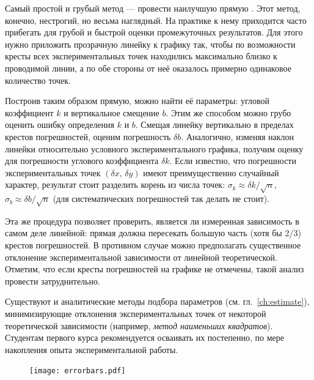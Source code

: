Самый простой и грубый метод --- провести наилучшую прямую
. Этот метод, конечно, нестрогий,
но весьма наглядный. На практике к нему приходится часто прибегать
для грубой и быстрой оценки промежуточных результатов. Для этого нужно
приложить прозрачную линейку к графику так, чтобы по возможности кресты
всех экспериментальных точек находились максимально близко к проводимой
линии, а по обе стороны от неё оказалось примерно одинаковое количество
точек.


Построив таким образом  прямую,
можно найти её параметры: угловой коэффициент $k$ и вертикальное
смещение $b$. Этим же способом можно грубо оценить ошибку определения
$k$ и $b$. Смещая линейку вертикально в пределах крестов погрешностей,
оценим погрешность $\delta b$. Аналогично, изменяя наклон линейки
относительно условного 
экспериментального графика, получим оценку для погрешности углового
коэффициента $\delta k$. Если известно, что погрешности экспериментальных
точек $\left(\delta x,\,\delta y\right)$ имеют преимущественно случайный
характер, результат стоит разделить корень из числа точек:
$\sigma_{k}\approx\delta k/\sqrt{n}$,
$\sigma_{b}\approx\delta b/\sqrt{n}$ (для систематических погрешностей
так делать не стоит).

Эта же процедура позволяет проверить, является ли измеренная зависимость
в самом деле линейной: прямая должна пересекать большую часть (хотя
бы 2/3) крестов погрешностей. В противном случае можно предполагать
существенное отклонение экспериментальной зависимости от линейной
теоретической. Отметим, что если кресты погрешностей на графике не
отмечены, такой анализ провести затруднительно.

Существуют и аналитические методы подбора параметров (см. гл.~\ref{ch:estimate}),
минимизирующие отклонения экспериментальных точек от некоторой теоретической зависимости
(например, \emph{метод наименьших квадратов}). Студентам первого курса
рекомендуется осваивать их постепенно, по мере накопления опыта экспериментальной
работы.

\begin{figure}
    \centering
    \texttt{[image: errorbars.pdf]}
    \caption{}
    \label{fig:graph-method}
\end{figure}


